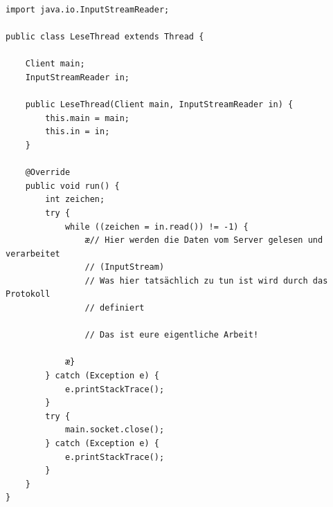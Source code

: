 \begin{lstlisting}
import java.io.InputStreamReader;

public class LeseThread extends Thread {

    Client main;
    InputStreamReader in;

    public LeseThread(Client main, InputStreamReader in) {
        this.main = main;
        this.in = in;
    }

    @Override
    public void run() {
        int zeichen;
        try {
            while ((zeichen = in.read()) != -1) {
                æ// Hier werden die Daten vom Server gelesen und verarbeitet
                // (InputStream)
                // Was hier tatsächlich zu tun ist wird durch das Protokoll
                // definiert

                // Das ist eure eigentliche Arbeit!

            æ}
        } catch (Exception e) {
            e.printStackTrace();
        }
        try {
            main.socket.close();
        } catch (Exception e) {
            e.printStackTrace();
        }
    }
}
\end{lstlisting}
